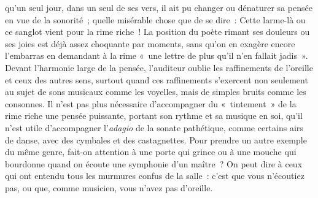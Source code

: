 \documentclass[french,twoside]{book} %
\begin{document}
qu’un seul jour, dans un seul de ses vers, il ait pu changer ou dénaturer sa pensée en vue de la sonorité ; quelle misérable chose que de se dire : Cette larme-là ou ce sanglot vient pour la rime riche ! La position du poète rimant ses douleurs ou ses joies est déjà assez choquante par moments, sans qu’on en exagère encore l’embarras en demandant à la rime « une lettre de plus qu’il n’en fallait jadis ». Devant l’harmonie large de la pensée, l’auditeur oublie les raffinements de l’oreille et ceux des autres sens, surtout quand ces raffinements s’exercent non seulement au sujet de sons musicaux comme les voyelles, mais de simples bruits comme les consonnes. Il n’est pas plus nécessaire d’accompagner du « tintement » de la rime riche une pensée puissante, portant son rythme et sa musique en soi, qu’il n’est utile d’accompagner l’\emph{adagio} de la sonate pathétique, comme certains airs de danse, avec des cymbales et des castagnettes. Pour prendre un autre exemple du même genre, fait-on attention à une porte qui grince ou à une mouche qui bourdonne quand on écoute une symphonie d’un maître ? On peut dire à ceux qui ont entendu tous les murmures confus de la salle : c’est que vous n’écoutiez pas, ou que, comme musicien, vous n’avez pas d’oreille.\par
\end{document}
